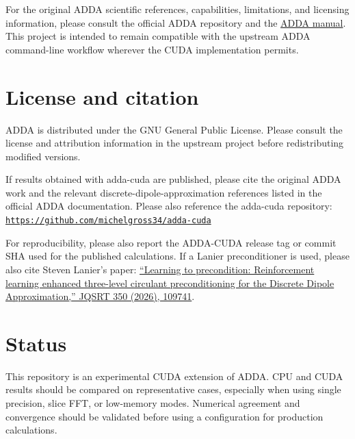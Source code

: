 \documentclass[11pt,a4paper]{article}
\begin{document}
For the original ADDA scientific references, capabilities, limitations, and
licensing information, please consult the official ADDA repository and the
\href{https://github.com/adda-team/adda/blob/master/doc/manual.pdf}{ADDA manual}.
This project is intended to remain compatible with the upstream ADDA
command-line workflow wherever the CUDA implementation permits.

\section{License and citation}

ADDA is distributed under the GNU General Public License. Please consult the
license and attribution information in the upstream project before
redistributing modified versions.

If results obtained with adda-cuda are published, please cite the original ADDA work and the relevant discrete-dipole-approximation references listed in the official ADDA documentation. Please also reference the adda-cuda repository:
\href{https://github.com/michelgross34/adda-cuda}{ \nolinkurl{https://github.com/michelgross34/adda-cuda}}



For reproducibility, please also report the ADDA-CUDA release tag or commit SHA
used for the published calculations. If a Lanier preconditioner is used, please
also cite Steven Lanier's paper:
\href{https://doi.org/10.1016/j.jqsrt.2025.109741}{``Learning to precondition:
Reinforcement learning enhanced three-level circulant preconditioning for the
Discrete Dipole Approximation,'' JQSRT 350 (2026), 109741}.

\section{Status}

This repository is an experimental CUDA extension of ADDA. CPU and CUDA
results should be compared on representative cases, especially when using
single precision, slice FFT, or low-memory modes. Numerical agreement and
convergence should be validated before using a configuration for production
calculations.
\end{document}
